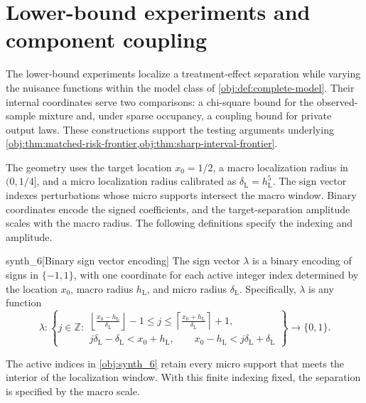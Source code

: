 \section{Lower-bound experiments and component coupling}

The lower-bound experiments localize a treatment-effect separation while varying the nuisance functions within the model class of \cref{obj:def:complete-model}. Their internal coordinates serve two comparisons: a chi-square bound for the observed-sample mixture and, under sparse occupancy, a coupling bound for private output laws. These constructions support the testing arguments underlying \cref{obj:thm:matched-risk-frontier,obj:thm:sharp-interval-frontier}.

The geometry uses the target location \(x_0=1/2\), a macro localization radius  in \((0,1/4]\), and a micro localization radius  calibrated as \(\delta_{\mathrm L}=h_{\mathrm L}^{5}\). The sign vector  indexes perturbations whose micro supports intersect the macro window. Binary coordinates encode the signed coefficients, and the target-separation amplitude  scales with the macro radius. The following definitions specify the indexing and amplitude.

\begin{definitionv}{synth_6}[Binary sign vector encoding]
The sign vector \(\lambda\) is a binary encoding of signs in \(\{-1,1\}\), with one coordinate for each active integer index determined by the location \(x_0\), macro radius \(h_{\mathrm L}\), and micro radius \(\delta_{\mathrm L}\). Specifically, \(\lambda\) is any function
\[
\lambda:
\left\{
j\in\mathbb Z:
\begin{gathered}
\left\lfloor\frac{x_0-h_{\mathrm L}}{\delta_{\mathrm L}}\right\rfloor-1
\le j\le
\left\lceil\frac{x_0+h_{\mathrm L}}{\delta_{\mathrm L}}\right\rceil+1,\\
j\delta_{\mathrm L}-\delta_{\mathrm L}<x_0+h_{\mathrm L},
\qquad
x_0-h_{\mathrm L}<j\delta_{\mathrm L}+\delta_{\mathrm L}
\end{gathered}
\right\}
\longrightarrow \{0,1\}.
\]
\end{definitionv}

The active indices in \cref{obj:synth_6} retain every micro support that meets the interior of the localization window. With this finite indexing fixed, the separation is specified by the macro scale.

